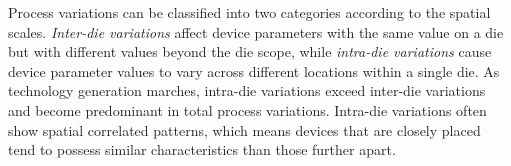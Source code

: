 \documentclass[referee]{ieice}
\begin{document}
Process variations can be classified into two categories according
to the spatial scales. {\it Inter-die variations} affect device
parameters with the same value on a die but with different values
beyond the die scope, while {\it intra-die variations} cause device
parameter values to vary across different locations within a single
die. As technology generation marches, intra-die variations exceed
inter-die variations and become predominant in total process
variations. Intra-die variations often show spatial correlated
patterns, which means devices that are closely placed tend to
possess similar characteristics than those further apart.
\end{document}
